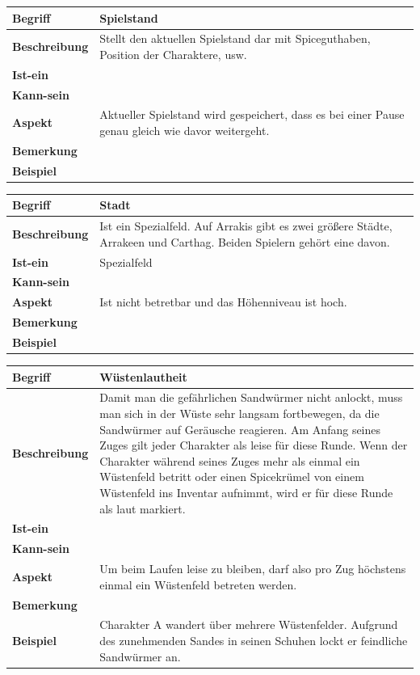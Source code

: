 \documentclass[12pt]{article}
\newcounter{fa}
\newcounter{nfa}
\begin{document}
\begin{tabularx}{16cm}{|l|X|}
\hline
\textbf{Begriff} & \textbf{Spielstand} \\
\hline
\textbf{Beschreibung} & Stellt den aktuellen Spielstand dar mit Spiceguthaben, Position der Charaktere, usw. \\
\hline
\textbf{Ist-ein} & \\
\hline
\textbf{Kann-sein} & \\
\hline
\textbf{Aspekt} & Aktueller Spielstand wird gespeichert, dass es bei einer Pause genau gleich wie davor weitergeht.\\
\hline
\textbf{Bemerkung} &  \\
\hline
\textbf{Beispiel} &  \\
\hline
\end{tabularx}

\begin{tabularx}{16cm}{|l|X|}
\hline
\textbf{Begriff} & \textbf{Stadt} \\
\hline
\textbf{Beschreibung} & Ist ein Spezialfeld. Auf Arrakis gibt es zwei größere Städte, Arrakeen und Carthag. Beiden Spielern gehört eine davon. \\
\hline
\textbf{Ist-ein} & Spezialfeld\\
\hline
\textbf{Kann-sein} & \\
\hline
\textbf{Aspekt} & Ist nicht betretbar und das Höhenniveau ist hoch.\\
\hline
\textbf{Bemerkung} &  \\
\hline
\textbf{Beispiel} &  \\
\hline
\end{tabularx}

\begin{tabularx}{16cm}{|l|X|}
\hline
\textbf{Begriff} & \textbf{Wüstenlautheit} \\
\hline
\textbf{Beschreibung} & Damit man die gefährlichen Sandwürmer nicht anlockt, muss man sich in der Wüste sehr langsam fortbewegen, da die Sandwürmer auf Geräusche reagieren. Am Anfang seines Zuges gilt jeder Charakter als \glqq{}leise\grqq{} für diese Runde. Wenn der Charakter während seines Zuges mehr als einmal ein Wüstenfeld betritt oder einen Spicekrümel von einem Wüstenfeld ins Inventar aufnimmt, wird er für diese Runde als \glqq{}laut\grqq{} markiert.\\
\hline
\textbf{Ist-ein} & \\
\hline
\textbf{Kann-sein} & \\
\hline
\textbf{Aspekt} & Um beim Laufen leise zu bleiben, darf also pro Zug höchstens einmal ein Wüstenfeld betreten werden.\\
\hline
\textbf{Bemerkung} &  \\
\hline
\textbf{Beispiel} & Charakter A wandert über mehrere Wüstenfelder. Aufgrund des zunehmenden Sandes in seinen Schuhen lockt er feindliche Sandwürmer an. \\
\hline
\end{tabularx}
\end{document}
